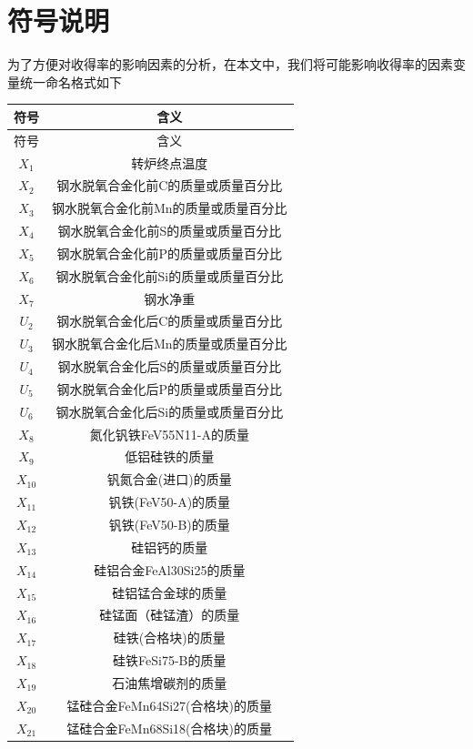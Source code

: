 \documentclass[12pt]{article}%
\begin{document}
\section{符号说明}
为了方便对收得率的影响因素的分析，在本文中，我们将可能影响收得率的因素变量统一命名格式如下
\begin{longtable}{|c|c|}
    \hline
符号&含义 \\
\hline \endfirsthead
\hline
符号&含义 \\
\hline
\endhead
\hline
    \endfoot
$X_{1}$ & 转炉终点温度 \\
$X_{2}$ & 钢水脱氧合金化前C的质量或质量百分比 \\
$X_{3}$ & 钢水脱氧合金化前Mn的质量或质量百分比 \\
$X_{4}$ & 钢水脱氧合金化前S的质量或质量百分比 \\
$X_{5}$ & 钢水脱氧合金化前P的质量或质量百分比 \\
$X_{6}$ & 钢水脱氧合金化前Si的质量或质量百分比 \\
$X_{7}$ & 钢水净重 \\\hline
$U_{2}$ & 钢水脱氧合金化后C的质量或质量百分比 \\
$U_{3}$ & 钢水脱氧合金化后Mn的质量或质量百分比 \\
$U_{4}$ & 钢水脱氧合金化后S的质量或质量百分比 \\
$U_{5}$ & 钢水脱氧合金化后P的质量或质量百分比 \\
$U_{6}$ & 钢水脱氧合金化后Si的质量或质量百分比 \\\hline
$X_{8}$ & 氮化钒铁FeV55N11-A的质量 \\
$X_{9}$ & 低铝硅铁的质量 \\
$X_{10}$ & 钒氮合金(进口)的质量 \\
$X_{11}$ & 钒铁(FeV50-A)的质量 \\
$X_{12}$ & 钒铁(FeV50-B)的质量 \\
$X_{13}$ & 硅铝钙的质量 \\
$X_{14}$ & 硅铝合金FeAl30Si25的质量 \\
$X_{15}$ & 硅铝锰合金球的质量 \\
$X_{16}$ & 硅锰面（硅锰渣）的质量 \\
$X_{17}$ & 硅铁(合格块)的质量 \\
$X_{18}$ & 硅铁FeSi75-B的质量 \\
$X_{19}$ & 石油焦增碳剂的质量 \\
$X_{20}$ & 锰硅合金FeMn64Si27(合格块)的质量 \\
$X_{21}$ & 锰硅合金FeMn68Si18(合格块)的质量 \\

\end{longtable}
\end{document}
